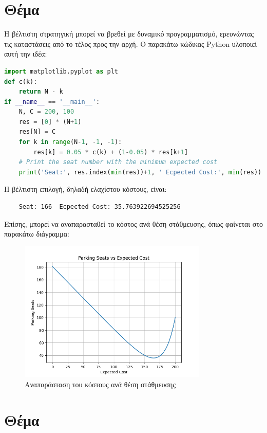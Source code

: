 \documentclass{article}
\newcommand{\eng}[1]{\foreignlanguage{english}{#1}} %
\begin{document}
\clearpage
\section{Θέμα}

Η βέλτιστη στρατηγική μπορεί να βρεθεί με δυναμικό προγραμματισμό, ερευνώντας
τις καταστάσεις από το τέλος προς την αρχή. Ο παρακάτω κώδικας \eng{Python}
υλοποιεί αυτή την ιδέα:

\begin{lstlisting}[language=Python]
import matplotlib.pyplot as plt
def c(k):
    return N - k
if __name__ == '__main__':
    N, C = 200, 100
    res = [0] * (N+1)
    res[N] = C
    for k in range(N-1, -1, -1):
        res[k] = 0.05 * c(k) + (1-0.05) * res[k+1]
    # Print the seat number with the minimum expected cost
    print('Seat:', res.index(min(res))+1, ' Ecpected Cost:', min(res))
\end{lstlisting}

Η βέλτιστη επιλογή, δηλαδή ελαχίστου κόστους, είναι:

\begin{verbatim}
    Seat: 166  Ecpected Cost: 35.763922694525256
\end{verbatim}

Επίσης, μπορεί να αναπαρασταθεί το κόστος ανά θέση στάθμευσης, όπως φαίνεται
στο παρακάτω διάγραμμα:

\begin{figure}[h]
    \centering
    \includegraphics[width=0.8\textwidth]{exercise3.png}
    \caption{Αναπαράσταση του κόστους ανά θέση στάθμευσης}
\end{figure}

\clearpage
\section{Θέμα}
\end{document}
